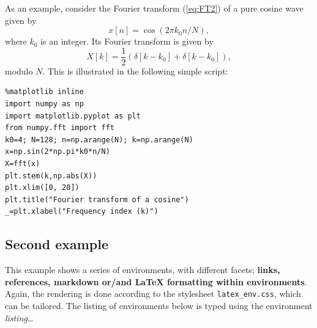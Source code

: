     As an example, consider the Fourier transform (\ref{eq:FT2}) of a pure
cosine wave given by \begin{equation}
x[n]= \cos(2\pi k_0 n/N),
\end{equation} where $k_0$ is an integer. Its Fourier transform is given by \begin{equation}
X[k] = \frac{1}{2} \left( \delta[k-k_0] + \delta[k-k_0] \right), 
\end{equation} modulo $N$. This is illustrated in the following simple script:
\begin{lstlisting}
%matplotlib inline
import numpy as np
import matplotlib.pyplot as plt 
from numpy.fft import fft
k0=4; N=128; n=np.arange(N); k=np.arange(N)
x=np.sin(2*np.pi*k0*n/N)
X=fft(x)
plt.stem(k,np.abs(X))
plt.xlim([0, 20])
plt.title("Fourier transform of a cosine")
_=plt.xlabel("Frequency index (k)")
\end{lstlisting}%
%
    \begin{center}
    \end{center}
    
    \subsection{Second example}\label{second-example}

    This example shows a series of environments, with different facets;
\textbf{links, references, markdown or/and LaTeX formatting within
environments}. Again, the rendering is done according to the stylesheet
\texttt{latex\_env.css}, which can be tailored. The listing of
environments below is typed using the environment \emph{listing}\ldots{}

